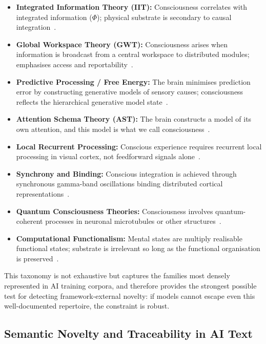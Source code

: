 \documentclass[pdflatex,sn-mathphys-num]{sn-jnl}
\begin{document}
\begin{itemize}
  \item \textbf{Integrated Information Theory (IIT):} Consciousness correlates
    with integrated information ($\Phi$); physical substrate is secondary to
    causal integration~\cite{tononi2004information}.
  \item \textbf{Global Workspace Theory (GWT):} Consciousness arises when
    information is broadcast from a central workspace to distributed modules;
    emphasises access and reportability~\cite{baars2005global,dehaene2011experimental}.
  \item \textbf{Predictive Processing / Free Energy:} The brain minimises
    prediction error by constructing generative models of sensory causes;
    consciousness reflects the hierarchical generative model
    state~\cite{friston2010free}.
  \item \textbf{Attention Schema Theory (AST):} The brain constructs a
    model of its own attention, and this model is what we call
    consciousness~\cite{graziano2019attention}.
  \item \textbf{Local Recurrent Processing:} Conscious experience requires
    recurrent local processing in visual cortex, not feedforward signals
    alone~\cite{lamme2006separate}.
  \item \textbf{Synchrony and Binding:} Conscious integration is achieved
    through synchronous gamma-band oscillations binding distributed cortical
    representations~\cite{singer1994role}.
  \item \textbf{Quantum Consciousness Theories:} Consciousness involves
    quantum-coherent processes in neuronal microtubules or other
    structures~\cite{hameroff2014consciousness,tegmark2000importance}.
  \item \textbf{Computational Functionalism:} Mental states are multiply
    realisable functional states; substrate is irrelevant so long as the
    functional organisation is preserved~\cite{searle1980minds}.
\end{itemize}

This taxonomy is not exhaustive but captures the families most densely
represented in AI training corpora, and therefore provides the strongest
possible test for detecting framework-external novelty: if models cannot escape
even this well-documented repertoire, the constraint is robust.

\subsection{Semantic Novelty and Traceability in AI Text}
\end{document}
